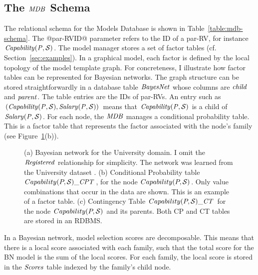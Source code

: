\documentclass{sfuthesis}
\begin{document}
\subsection{The $\MDB$ Schema}
The relational schema for the Models Database is shown in Table~\ref{table:mdb-schema}. The @par-RVID@ parameter refers to the ID  of a par-RV, for instance $\it{Capability}(\P,\S)$.
The model manager stores a set of factor tables (cf. Section~\ref{sec:examples}). In a graphical model, each factor is defined by the local topology of the model template graph. For concreteness, I  illustrate how factor tables can be represented  for Bayesian networks. The graph structure can be stored straightforwardly in a database table $\it{BayesNet}$ whose columns are $\it{child}$ and $\it{parent}$. The table entries are the IDs of par-RVs. An entry such as $(\it{Capability}(\P,\S),\it{Salary}(\P,\S))$ means that $\it{Capability}(\P,\S)$ is a child of $\it{Salary}(\P,\S)$.  For each node, the $\MDB$ manages a conditional probability table. This is a factor table that represents the factor associated with the node's family (see Figure~\ref{fig:ct-cp-table}(b)).

\begin{figure}[!h]
 \centering
{} 
\caption{(a) Bayesian network for the University domain. I  omit the $\it{Registered}$ relationship for simplicity. The network was learned from the University dataset \cite{bib:bbsite}. (b) Conditional Probability table $Capability(\P,\S)\_\cptable$, for the node $Capability(\P,\S)$. Only value combinations that occur in the data are shown. This is an example of a factor table. (c) Contingency Table $Capability(\P,\S)\_\cttable$ for the node $Capability(\P,\S)$ and its parents. Both CP and CT tables are stored in an RDBMS.}
\label{fig:ct-cp-table}
\end{figure}
In a Bayesian network, model selection scores are decomposable. This means that there is a local score associated with each family, such that the total score for the BN model is the sum of the local scores. For each family, the local score is stored in the $\it{Scores}$ table indexed by the family's child node.
\end{document}
